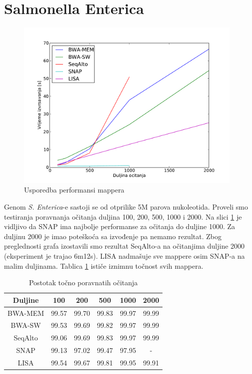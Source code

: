\documentclass[times, utf8, diplomski]{fer}
\begin{document}
\section {Salmonella Enterica}

\begin{figure}[H]
\centering
\includegraphics[width=0.97\textwidth]{../img/salmonella-time.pdf}
\caption{Usporedba performansi mappera}\label{salmonella-time}
\end{figure}

Genom \emph{S. Enterica}-e sastoji se od otprilike 5M parova nukoleotida. Proveli smo testiranja poravnanja očitanja duljina 100, 200, 500, 1000 i 2000. Na slici \ref{salmonella-time} je vidljivo da SNAP ima najbolje performanse za očitanja do duljine 1000. Za duljinu 2000 je imao poteškoća sa izvođenje pa nemamo rezultat. Zbog preglednosti grafa izostavili smo rezultat SeqAlto-a na očitanjima duljine 2000 (eksperiment je trajao 6m12s). LISA nadmašuje sve mappere osim SNAP-a na malim duljinama. Tablica \ref{salmonella-correct} ističe iznimnu točnost svih mappera.

\begin{table}[H]
\centering
\begin{tabular}{|c||c|c|c|c|c|}
\hline
	Duljine & 100 & 200 & 500 & 1000 & 2000\\
\hline
\hline
	BWA-MEM & 99.57 & 99.70 & 99.83 & 99.97 & 99.99\\
\hline
	BWA-SW  & 99.53 & 99.69 & 99.82 & 99.97 & 99.99\\
\hline
	SeqAlto & 99.06 & 99.69 & 99.83 & 99.97 & 99.99\\
\hline
	SNAP    & 99.13 & 97.02 & 99.47 & 97.95 & -\\
\hline
	LISA    & 99.54 & 99.67 & 99.81 & 99.95 & 99.91\\
\hline
\end{tabular}
\caption{Postotak točno poravnatih očitanja}\label{salmonella-correct}
\end{table}
\end{document}
